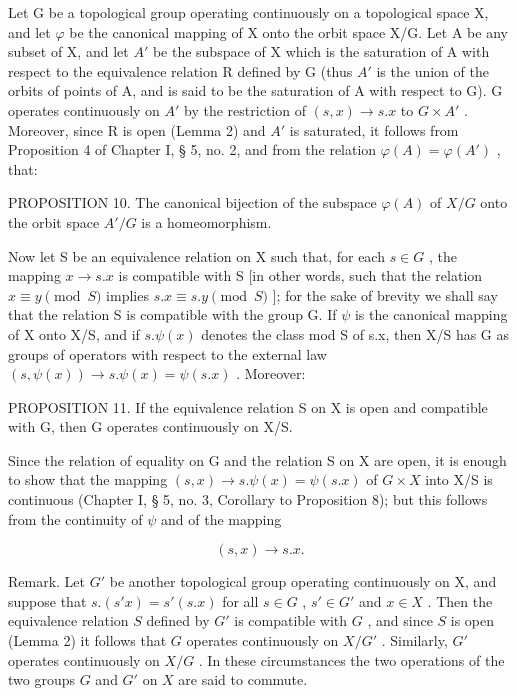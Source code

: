 Let G be a topological group operating continuously on a topological space X, and let \(\varphi\) be the canonical mapping of X onto the orbit space X/G. Let A be any subset of X, and let \(A'\) be the subspace of X which is the saturation of A with respect to the equivalence relation R defined by G (thus \(A'\) is the union of the orbits of points of A, and is said to be the saturation of A with respect to G). G operates continuously on \(A'\) by the restriction of \((s, x) \to s.x\) to \(G \times A'\) . Moreover, since R is open (Lemma 2) and \(A'\) is saturated, it follows from Proposition 4 of Chapter I, § 5, no. 2, and from the relation \(\varphi(A) = \varphi(A')\) , that:

PROPOSITION 10. The canonical bijection of the subspace \(\varphi(A)\) of \(X/G\) onto the orbit space \(A'/G\) is a homeomorphism.

Now let S be an equivalence relation on X such that, for each \(s \in G\) , the mapping \(x \to s.x\) is compatible with S {[}in other words, such that the relation \(x \equiv y \pmod{S}\) implies \(s.x \equiv s.y \pmod{S}\) {]}; for the sake of brevity we shall say that the relation S is compatible with the group G. If \(\psi\) is the canonical mapping of X onto X/S, and if \(s.\psi(x)\) denotes the class mod S of s.x, then X/S has G as groups of operators with respect to the external law \((s, \psi(x)) \to s.\psi(x) = \psi(s.x)\) . Moreover:

PROPOSITION 11. If the equivalence relation S on X is open and compatible with G, then G operates continuously on X/S.

Since the relation of equality on G and the relation S on X are open, it is enough to show that the mapping \((s,x)\to s.\psi(x)=\psi(s.x)\) of \(G\times X\) into X/S is continuous (Chapter I, § 5, no. 3, Corollary to Proposition 8); but this follows from the continuity of \(\psi\) and of the mapping

\[
(s, x) \rightarrow s. x.
\]

Remark. Let \(G'\) be another topological group operating continuously on X, and suppose that \(s.(s'x) = s'(s.x)\) for all \(s \in G\) , \(s' \in G'\) and \(x \in X\) . Then the equivalence relation \(S\) defined by \(G'\) is compatible with \(G\) , and since \(S\) is open (Lemma 2) it follows that \(G\) operates continuously on \(X/G'\) . Similarly, \(G'\) operates continuously on \(X/G\) . In these circumstances the two operations of the two groups \(G\) and \(G'\) on \(X\) are said to commute.

